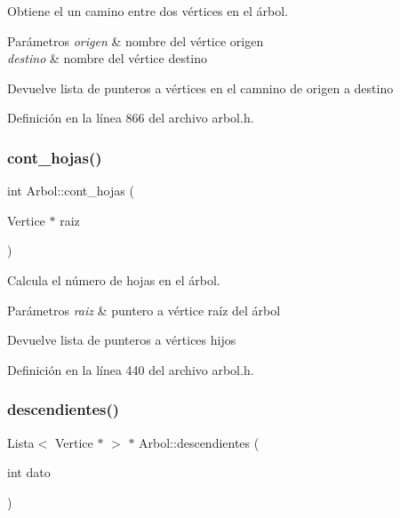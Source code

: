 Obtiene el un camino entre dos vértices en el árbol. 


\begin{DoxyParams}{Parámetros}
{\em origen} & nombre del vértice origen \\
\hline
{\em destino} & nombre del vértice destino \\
\hline
\end{DoxyParams}
\begin{DoxyReturn}{Devuelve}
lista de punteros a vértices en el camnino de origen a destino 
\end{DoxyReturn}


Definición en la línea 866 del archivo arbol.\+h.

\mbox{\label{classArbol_aba59969b2a10294fb79e583a8e9471c5}} 
\subsubsection{\texorpdfstring{cont\+\_\+hojas()}{cont\_hojas()}}
{\footnotesize\ttfamily int Arbol\+::cont\+\_\+hojas (\begin{DoxyParamCaption}\item[{Vertice $\ast$}]{raiz }\end{DoxyParamCaption})}



Calcula el número de hojas en el árbol. 


\begin{DoxyParams}{Parámetros}
{\em raiz} & puntero a vértice raíz del árbol \\
\hline
\end{DoxyParams}
\begin{DoxyReturn}{Devuelve}
lista de punteros a vértices hijos 
\end{DoxyReturn}


Definición en la línea 440 del archivo arbol.\+h.

\mbox{\label{classArbol_acae8e9dfd17ae18e250d9029172e1c9e}} 
\subsubsection{\texorpdfstring{descendientes()}{descendientes()}\hspace{0.1cm}{\footnotesize\ttfamily [1/2]}}
{\footnotesize\ttfamily Lista$<$ Vertice $\ast$ $>$ $\ast$ Arbol\+::descendientes (\begin{DoxyParamCaption}\item[{int}]{dato }\end{DoxyParamCaption})}




